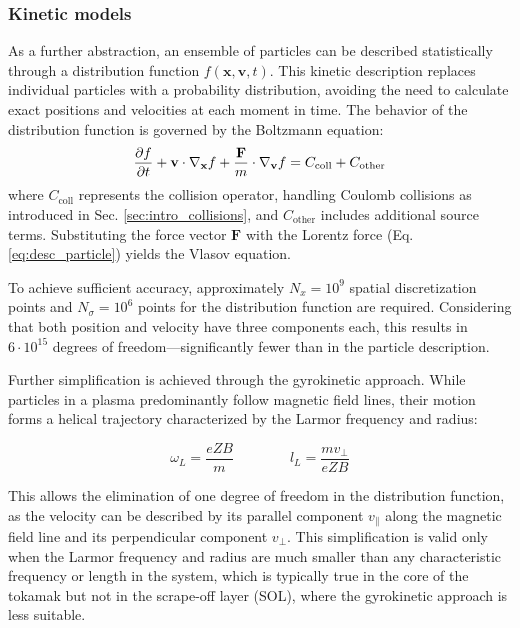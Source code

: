 \subsubsection{Kinetic models}
\label{ssec:desc_kineticModels}
As a further abstraction, an ensemble of particles can be described statistically through a distribution function $f(\mathbf{x}, \mathbf{v},t)$. This kinetic description replaces individual particles with a probability distribution, avoiding the need to calculate exact positions and velocities at each moment in time. The behavior of the distribution function is governed by the Boltzmann equation:
\begin{equation}
	\label{eq:BoltzmannEquationKineticDescription}
	\pdv{f}{t} + \mathbf{v} \cdot \nabla_{\mathbf{x}} f + \frac{\mathbf{F}}{m} \cdot \nabla_{\mathbf{v}} f = C_{\text{coll}} + C_{\text{other}}
\end{equation}
where $C_{\text{coll}}$ represents the collision operator, handling Coulomb collisions as introduced in Sec. \ref{sec:intro_collisions}, and $C_{\text{other}}$ includes additional source terms. Substituting the force vector $\mathbf{F}$ with the Lorentz force (Eq. \ref{eq:desc_particle}) yields the Vlasov equation. \newline

To achieve sufficient accuracy, approximately $N_x = 10^9$ spatial discretization points and $N_\sigma = 10^6$ points for the distribution function are required. Considering that both position and velocity have three components each, this results in $6 \cdot 10^{15}$ degrees of freedom—significantly fewer than in the particle description. \newline

Further simplification is achieved through the gyrokinetic approach. While particles in a plasma predominantly follow magnetic field lines, their motion forms a helical trajectory characterized by the Larmor frequency and radius:

\begin{equation}
	\omega_L = \frac{eZB}{m} \qquad\qquad l_L = \frac{mv_\perp}{eZB}
\end{equation}

This allows the elimination of one degree of freedom in the distribution function, as the velocity can be described by its parallel component $v_\parallel$ along the magnetic field line and its perpendicular component $v_\perp$. This simplification is valid only when the Larmor frequency and radius are much smaller than any characteristic frequency or length in the system, which is typically true in the core of the tokamak but not in the scrape-off layer (SOL), where the gyrokinetic approach is less suitable. \\

